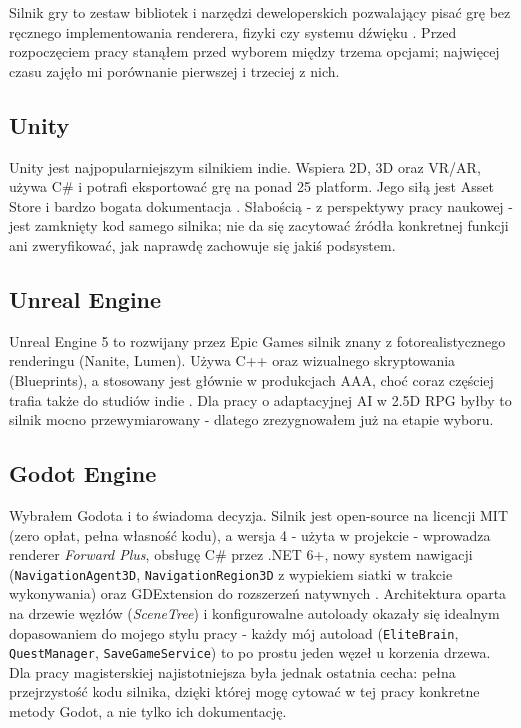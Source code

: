 Silnik gry to zestaw bibliotek i narzędzi deweloperskich pozwalający pisać grę bez ręcznego implementowania renderera, fizyki czy systemu dźwięku \cite{gregory2018game}. Przed rozpoczęciem pracy stanąłem przed wyborem między trzema opcjami; najwięcej czasu zajęło mi porównanie pierwszej i trzeciej z nich.

\subsection{Unity}

Unity jest najpopularniejszym silnikiem indie. Wspiera 2D, 3D oraz VR/AR, używa C\# i potrafi eksportować grę na ponad 25 platform. Jego siłą jest Asset Store i bardzo bogata dokumentacja \cite{haas2014history}. Słabością - z perspektywy pracy naukowej - jest zamknięty kod samego silnika; nie da się zacytować źródła konkretnej funkcji ani zweryfikować, jak naprawdę zachowuje się jakiś podsystem.

\subsection{Unreal Engine}

Unreal Engine 5 to rozwijany przez Epic Games silnik znany z fotorealistycznego renderingu (Nanite, Lumen). Używa C++ oraz wizualnego skryptowania (Blueprints), a stosowany jest głównie w produkcjach AAA, choć coraz częściej trafia także do studiów indie \cite{sherrod2007game}. Dla pracy o adaptacyjnej AI w 2.5D RPG byłby to silnik mocno przewymiarowany - dlatego zrezygnowałem już na etapie wyboru.

\subsection{Godot Engine}

Wybrałem Godota i to świadoma decyzja. Silnik jest open-source na licencji MIT (zero opłat, pełna własność kodu), a wersja 4 - użyta w projekcie - wprowadza renderer \textit{Forward Plus}, obsługę C\# przez .NET 6+, nowy system nawigacji (\texttt{NavigationAgent3D}, \texttt{NavigationRegion3D} z wypiekiem siatki w trakcie wykonywania) oraz GDExtension do rozszerzeń natywnych \cite{godot4docs}. Architektura oparta na drzewie węzłów (\textit{SceneTree}) i konfigurowalne autoloady okazały się idealnym dopasowaniem do mojego stylu pracy - każdy mój autoload (\texttt{EliteBrain}, \texttt{QuestManager}, \texttt{SaveGameService}) to po prostu jeden węzeł u korzenia drzewa. Dla pracy magisterskiej najistotniejsza była jednak ostatnia cecha: pełna przejrzystość kodu silnika, dzięki której mogę cytować w tej pracy konkretne metody Godot, a nie tylko ich dokumentację.

